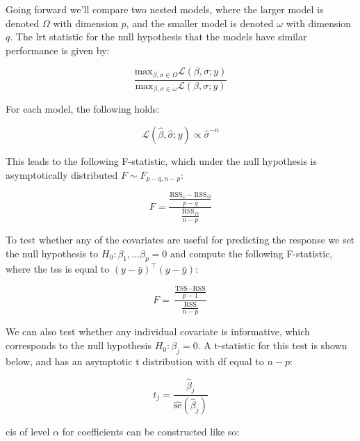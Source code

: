 \documentclass{report}
\begin{document}
Going forward we'll compare two nested models, where the larger model is denoted $\Omega$ with dimension $p$, and the smaller model is denoted $\omega$ with dimension $q$. The \gls{lrt} statistic for the null hypothesis that the models have similar performance is given by:

\begin{equation}\label{eq:ols-lrt-stat}
    \frac{\text{max}_{\beta, \sigma \in \Omega} \mathcal{L}(\beta, \sigma; y)}{\text{max}_{\beta, \sigma \in \omega} \mathcal{L}(\beta, \sigma; y)}
\end{equation}

For each model, the following holds:

\begin{equation}\label{eq:likelihood-prop-to-sigma}
    \mathcal{L}\left(\hat{\beta}, \hat{\sigma}; y\right) \propto \hat{\sigma}^{-n}
\end{equation}

This leads to the following F-statistic, which under the null hypothesis is asymptotically distributed $F \sim F_{p-q, n-p}$:

\begin{equation}\label{eq:ols-f-stat-nested}
    F = \frac{\frac{\text{RSS}_\omega - \text{RSS}_\Omega}{p-q}}{\frac{\text{RSS}_\Omega}{n-p}}
\end{equation}

To test whether any of the covariates are useful for predicting the response we set the null hypothesis to $H_0: \beta_1, \dots \beta_p = 0$ and compute the following F-statistic, where the \gls{tss} is equal to $(y - \bar{y})^\intercal (y - \bar{y})$:

\begin{equation}\label{eq:ols-f-stat-overall}
    F = \frac{\frac{\text{TSS} - \text{RSS}}{p-1}}{\frac{\text{RSS}}{n-p}}
\end{equation}

We can also test whether any individual covariate is informative, which corresponds to the null hypothesis $H_0: \beta_j = 0$. A t-statistic for this test is shown below, and has an asymptotic t distribution with \gls{df} equal to $n-p$:

\begin{equation}\label{eq:ols-t-stat}
    t_j = \frac{\hat{\beta}_j}{\widehat{\text{se}}\left(\hat{\beta}_j\right)}
\end{equation}

\Glspl{ci} of level $\alpha$ for coefficients can be constructed like so:
\end{document}
